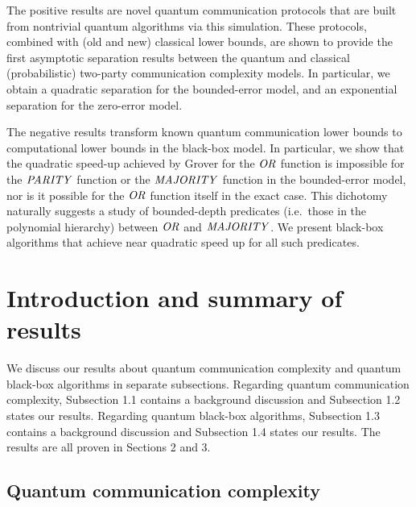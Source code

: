 The positive results are novel  quantum communication protocols that 
are built from nontrivial quantum algorithms via this simulation.
These protocols, combined with (old and new) classical lower bounds, 
are shown to provide the first asymptotic separation results between
the quantum and classical (probabilistic) two-party communication 
complexity models.
In particular, we obtain a quadratic separation for the bounded-error 
model, and an exponential separation for the zero-error model.

The negative results transform  known quantum communication lower 
bounds to computational lower bounds in the black-box model.
In particular, we show that the quadratic speed-up achieved by Grover 
for the $\mbox{\it OR\/}$ function is impossible for the $\mbox{\it PARITY\/}$ function or the $\mbox{\it MAJORITY\/}$ 
function in the bounded-error model, nor is it possible for the $\mbox{\it OR\/}$
function itself in the exact case.
This dichotomy naturally suggests a study of bounded-depth predicates 
(i.e.\ those in the polynomial hierarchy) between $\mbox{\it OR\/}$ and $\mbox{\it MAJORITY\/}$.
We present black-box algorithms that achieve near quadratic speed up for
all such predicates.


\section{Introduction and summary of results}

We discuss our results about quantum communication complexity and 
quantum black-box algorithms in separate subsections.
Regarding quantum communication complexity, Subsection 1.1 
contains a background discussion and Subsection 1.2 states our results.
Regarding quantum black-box algorithms, Subsection 1.3 
contains a background discussion and Subsection 1.4 states our results.
The results are all proven in Sections 2 and 3.

\subsection{Quantum communication complexity}

